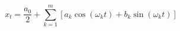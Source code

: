 \documentclass{article}
\begin{document}
\begin{equation*} %
x_t = \frac{a_0}{2} + \sum_{k=1}^m [a_k \cos (\omega_k t) + b_k \sin
  (\omega_k t) ]
\end{equation*}
\end{document}
